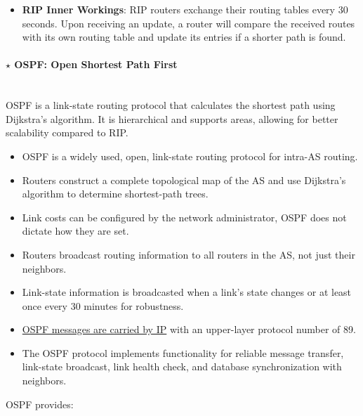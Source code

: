\begin{itemize}
    \item \textbf{RIP Inner Workings}: RIP routers exchange their routing tables every 30 seconds. Upon receiving an update, a router will compare the received routes with its own routing table and update its entries if a shorter path is found.
\end{itemize}

\paragraph[4.3.2.2 OSPF: Open Shortest Path First]{$\pmb{\star}$ OSPF: Open Shortest Path First}\mbox{}\\[4pt]
OSPF is a link-state routing protocol that calculates the shortest path using Dijkstra's algorithm. It is hierarchical and supports areas, allowing for better scalability compared to RIP.

\begin{itemize}
    \item OSPF is a widely used, open, link-state routing protocol for intra-AS routing.
    \item Routers construct a complete topological map of the AS and use Dijkstra's algorithm to determine shortest-path trees.
    \item Link costs can be configured by the network administrator, OSPF does not dictate how they are set.
    \item Routers broadcast routing information to all routers in the AS, not just their neighbors.
    \item Link-state information is broadcasted when a link's state changes or at least once every 30 minutes for robustness.
    \item \underline{OSPF messages are carried by IP} with an upper-layer protocol number of 89.
    \item The OSPF protocol implements functionality for reliable message transfer, link-state broadcast, link health check, and database synchronization with neighbors.
\end{itemize}

\noindent OSPF provides:

